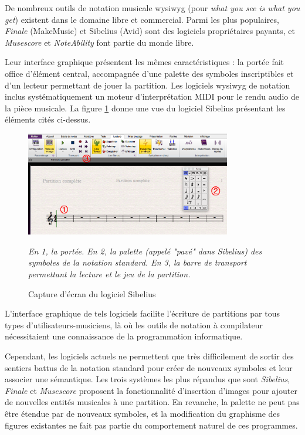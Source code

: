 De nombreux outils de notation musicale wysiwyg (pour \textit{what you see is what you get}) existent dans le domaine libre et commercial. Parmi les plus populaires, \textit{Finale} (MakeMusic) et Sibelius (Avid) sont des logiciels propriétaires payants, et \textit{Musescore} et \textit{NoteAbility} font partie du monde libre.

Leur interface graphique présentent les mêmes caractéristiques : la portée fait office d'élément central, accompagnée d'une palette des symboles inscriptibles et d'un lecteur permettant de jouer la partition.
Les logiciels wysiwyg de notation inclus systématiquement un moteur d'interprétation MIDI pour le rendu audio de la pièce musicale.
La figure \ref{fig:sibeliusScreenshot} donne une vue du logiciel Sibelius présentant les éléments cités ci-dessus.

\begin{figure}[H]
	\centering
	\includegraphics[keepaspectratio=true, width=0.8\textwidth]{OutilsInformatiques/i/sibeliusScreenshot.png}
	\caption{Capture d'écran du logiciel Sibelius}
	\label{fig:sibeliusScreenshot}
	\small \it
	En 1, la portée. En 2, la palette (appelé "pavé" dans Sibelius) des symboles de la notation standard.
	En 3, la barre de transport permettant la lecture et le jeu de la partition. 			
\end{figure}

L'interface graphique de tels logiciels facilite l'écriture de partitions par tous types d'utilisateurs-musiciens, là où les outils de notation à compilateur nécessitaient une connaissance de la programmation informatique.

Cependant, les logiciels actuels ne permettent que très difficilement de sortir des sentiers battus de la notation standard pour créer de nouveaux symboles et leur associer une sémantique. Les trois systèmes les plus répandus que sont \textit{Sibelius}, \textit{Finale} et \textit{Musescore} proposent la fonctionnalité d'insertion d'images pour ajouter de nouvelles entités musicales à une partition. En revanche, la palette ne peut pas être étendue par de nouveaux symboles, et la modification du graphisme des figures existantes ne fait pas partie du comportement naturel de ces programmes.

